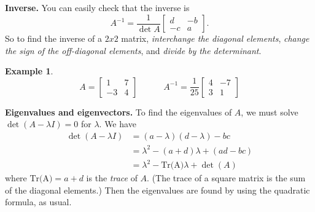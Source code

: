\documentclass[reqno]{immbook}
\numberwithin{equation}{chapter}
\numberwithin{question}{section}
\numberwithin{theorem}{chapter}
\numberwithin{figure}{chapter}
\theoremstyle{definition}
\newtheorem{example}{Example}[section]
\begin{document}
\noindent
\textbf{Inverse.}
You can easily check that the inverse is
\[
   A^{-1} = \frac{1}{\det A}\begin{bmatrix}
                               d & -b \\ -c & a
                            \end{bmatrix}.
\]
So to find the inverse of a $2x2$ matrix,
\emph{interchange the diagonal elements}, \emph{change the sign of the off-diagonal elements}, and
\emph{divide by the determinant}.

\begin{example}
\[
  A = \begin{bmatrix}
          1 & 7 \\ -3 & 4
      \end{bmatrix}
  \quad\quad\quad
  A^{-1} = \frac{1}{25}\begin{bmatrix}
                          4 & -7 \\ 3 & 1
                       \end{bmatrix}
\]
\end{example}

\noindent
\textbf{Eigenvalues and eigenvectors.}
To find the eigenvalues of $A$, we must solve
$\det(A-\lambda I)=0$ for $\lambda$.
We have
\[
\begin{split}
   \det(A-\lambda I) & = (a-\lambda)(d-\lambda)-bc \\
                     & = \lambda^2-(a+d)\lambda + (ad-bc) \\
		     & = \lambda^2 - \textrm{Tr(A)}\lambda + \det(A)
\end{split}
\]
where $\textrm{Tr(A)} = a+d$ is the \emph{trace} of $A$.
(The trace of a square matrix is the sum of the diagonal elements.)
Then the eigenvalues are found by using the quadratic
formula, as usual.
\end{document}

